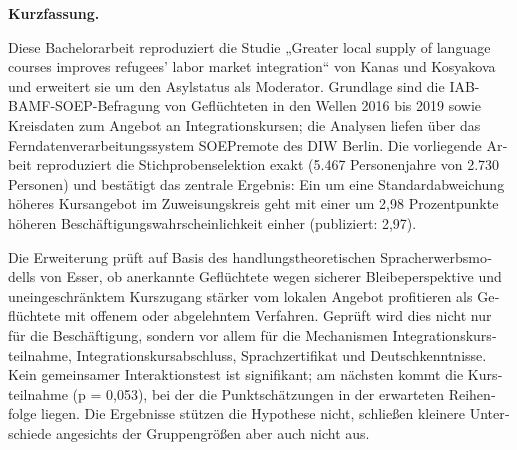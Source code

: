 \bigskip
\begin{otherlanguage}{ngerman}
\noindent\textbf{Kurzfassung.}\enspace

Diese Bachelorarbeit reproduziert die Studie „Greater local supply of language courses improves refugees' labor market integration“ von Kanas und Kosyakova und erweitert sie um den Asylstatus als Moderator. Grundlage sind die IAB-BAMF-SOEP-Befragung von Geflüchteten in den Wellen 2016 bis 2019 sowie Kreisdaten zum Angebot an Integrationskursen; die Analysen liefen über das Ferndatenverarbeitungssystem SOEPremote des DIW Berlin. Die vorliegende Arbeit reproduziert die Stichprobenselektion exakt (5.467 Personenjahre von 2.730 Personen) und bestätigt das zentrale Ergebnis: Ein um eine Standardabweichung höheres Kursangebot im Zuweisungskreis geht mit einer um 2,98 Prozentpunkte höheren Beschäftigungswahrscheinlichkeit einher (publiziert: 2,97). 

Die Erweiterung prüft auf Basis des handlungstheoretischen Spracherwerbsmodells von Esser, ob anerkannte Geflüchtete wegen sicherer Bleibeperspektive und uneingeschränktem Kurszugang stärker vom lokalen Angebot profitieren als Geflüchtete mit offenem oder abgelehntem Verfahren. Geprüft wird dies nicht nur für die Beschäftigung, sondern vor allem für die Mechanismen Integrationskursteilnahme, Integrationskursabschluss, Sprachzertifikat und Deutschkenntnisse. Kein gemeinsamer Interaktionstest ist signifikant; am nächsten kommt die Kursteilnahme (p = 0,053), bei der die Punktschätzungen in der erwarteten Reihenfolge liegen. Die Ergebnisse stützen die Hypothese nicht, schließen kleinere Unterschiede angesichts der Gruppengrößen aber auch nicht aus.

\end{otherlanguage}
